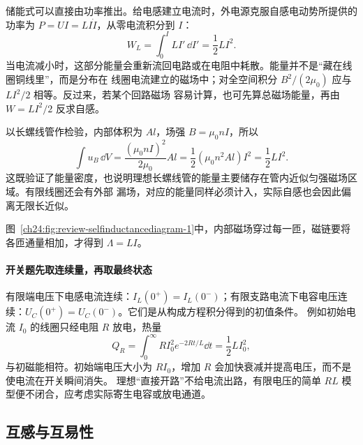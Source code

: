 储能式可以直接由功率推出。给电感建立电流时，外电源克服自感电动势所提供的功率为
$P=UI=LI\dot I$，从零电流积分到 $I$：
\begin{equation}
  W_L=\int_0^I LI'\,\dd I'=\frac12LI^2.
\end{equation}
当电流减小时，这部分能量会重新流回电路或在电阻中耗散。能量并不是“藏在线圈铜线里”，而是分布在
线圈电流建立的磁场中；对全空间积分 $B^2/(2\mu_0)$ 应与 $LI^2/2$ 相等。反过来，若某个回路磁场
容易计算，也可先算总磁场能量，再由 $W=LI^2/2$ 反求自感。

以长螺线管作检验，内部体积为 $Al$，场强 $B=\mu_0nI$，所以
\begin{equation}
  \int u_B\,\dd V
  =\frac{(\mu_0nI)^2}{2\mu_0}Al
  =\frac12(\mu_0n^2Al)I^2
  =\frac12LI^2.
\end{equation}
这既验证了能量密度，也说明理想长螺线管的能量主要储存在管内近似匀强磁场区域。有限线圈还会有外部
漏场，对应的能量同样必须计入，实际自感也会因此偏离无限长近似。

图~\ref{ch24:fig:review-selfinductancediagram-1}中，内部磁场穿过每一匝，磁链要将各匝通量相加，才得到 $\Lambda=LI$。
\par\noindent\begin{minipage}{\linewidth}
\selfInductanceDiagram
{}\label{ch24:fig:review-selfinductancediagram-1}
\end{minipage}\par\medskip


\paragraph{开关题先取连续量，再取最终状态}
有限端电压下电感电流连续：$I_L(0^+)=I_L(0^-)$；有限支路电流下电容电压连续：$U_C(0^+)=U_C(0^-)$。它们是从构成方程积分得到的初值条件。
例如初始电流 $I_0$ 的线圈只经电阻 $R$ 放电，热量
\[
 Q_R=\int_0^\infty RI_0^2e^{-2Rt/L}\dd t=\frac12LI_0^2,
\]
与初磁能相符。初始端电压大小为 $RI_0$，增加 $R$ 会加快衰减并提高电压，而不是使电流在开关瞬间消失。
理想“直接开路”不给电流出路，有限电压的简单 $RL$ 模型便不闭合，应考虑实际寄生电容或放电通道。

\subsection{互感与互易性}

